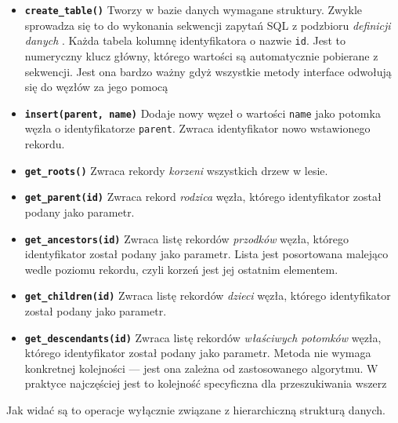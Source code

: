 \begin{itemize}
    \item \textbf{\texttt{create\_table()}}
        Tworzy w bazie danych wymagane struktury.
        Zwykle sprowadza się to do wykonania sekwencji zapytań SQL z podzbioru \emph{definicji danych} .
        Każda tabela kolumnę identyfikatora o nazwie \texttt{id}. 
        Jest to numeryczny klucz główny,
        którego wartości są automatycznie pobierane z sekwencji.
        Jest ona bardzo ważny gdyż wszystkie metody interface odwołują się do węzłów za jego pomocą
    \item \textbf{\texttt{insert(parent, name)}}
    	Dodaje nowy węzeł o wartości \texttt{name} jako potomka węzła o identyfikatorze \texttt{parent}.
    	Zwraca identyfikator nowo wstawionego rekordu.
    \item \textbf{\texttt{get\_roots()}}
    	Zwraca rekordy  \emph{korzeni} wszystkich drzew w lesie.
    \item \textbf{\texttt{get\_parent(id)}}
    	Zwraca rekord \emph{rodzica} węzła, którego identyfikator został podany jako parametr.
    \item \textbf{\texttt{get\_ancestors(id)}}
    	Zwraca listę rekordów  \emph{przodków} węzła, którego identyfikator został podany jako parametr.
    	Lista jest posortowana malejąco wedle poziomu rekordu, czyli korzeń jest jej ostatnim elementem.
    \item \textbf{\texttt{get\_children(id)}}
    	Zwraca listę rekordów \emph{dzieci} węzła, którego identyfikator został podany jako parametr.
    \item \textbf{\texttt{get\_descendants(id)}}
    	Zwraca listę rekordów \emph{właściwych potomków} węzła, którego identyfikator został podany jako parametr.
    	Metoda nie wymaga konkretnej kolejności --- jest ona zależna od zastosowanego algorytmu.
    	W praktyce najczęściej jest to kolejność specyficzna dla przeszukiwania wszerz
\end{itemize}

Jak widać są to operacje wyłącznie związane z hierarchiczną strukturą danych.





